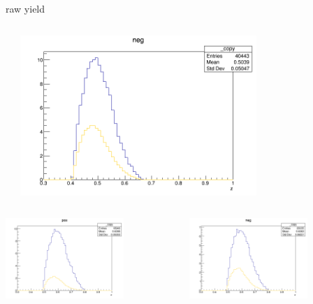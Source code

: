 \begin{frame}{raw yield}
\begin{columns}
\begin{column}[T]{0.25\textwidth}
\end{column}
\begin{column}[T]{0.25\textwidth}
\includegraphics[width = 0.7\textwidth]{results/yield/statistics/yield_x_Q2_z_0.55_4.764_0.50_neg.png}
\end{column}
\end{columns}
\begin{columns}
\begin{column}[T]{0.25\textwidth}
\includegraphics[width = 0.7\textwidth]{results/yield/statistics/yield_x_Q2_z_0.55_4.764_0.60_pos.png}
\end{column}
\begin{column}[T]{0.25\textwidth}
\includegraphics[width = 0.7\textwidth]{results/yield/statistics/yield_x_Q2_z_0.55_4.764_0.60_neg.png}

\end{column}
\end{columns}
\end{frame}
